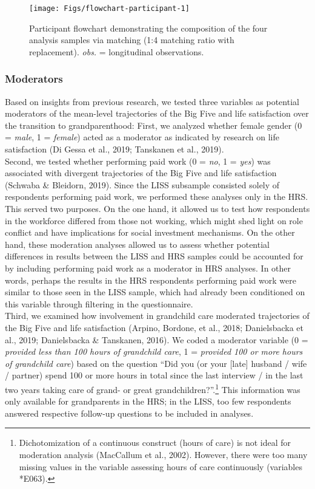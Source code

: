 \documentclass[
  english,
  man,floatsintext]{apa7}
\begin{document}
\begin{figure}

{\centering \texttt{[image: Figs/flowchart-participant-1]} 

}

\caption{Participant flowchart demonstrating the composition of the four analysis samples via matching (1:4 matching ratio with replacement). \emph{obs.} = longitudinal observations.}\label{fig:flowchart-participant}
\end{figure}

\hypertarget{moderators}{%
\subsubsection{Moderators}\label{moderators}}

Based on insights from previous research, we tested three variables as potential moderators of the mean-level trajectories of the Big Five and life satisfaction over the transition to grandparenthood: First, we analyzed whether female gender (0 = \emph{male}, 1 = \emph{female}) acted as a moderator as indicated by research on life satisfaction (Di Gessa et al., 2019; Tanskanen et al., 2019).\\
Second, we tested whether performing paid work (0 = \emph{no}, 1 = \emph{yes}) was associated with divergent trajectories of the Big Five and life satisfaction (Schwaba \& Bleidorn, 2019). Since the LISS subsample consisted solely of respondents performing paid work, we performed these analyses only in the HRS. This served two purposes. On the one hand, it allowed us to test how respondents in the workforce differed from those not working, which might shed light on role conflict and have implications for social investment mechanisms. On the other hand, these moderation analyses allowed us to assess whether potential differences in results between the LISS and HRS samples could be accounted for by including performing paid work as a moderator in HRS analyses. In other words, perhaps the results in the HRS respondents performing paid work were similar to those seen in the LISS sample, which had already been conditioned on this variable through filtering in the questionnaire.\\
Third, we examined how involvement in grandchild care moderated trajectories of the Big Five and life satisfaction (Arpino, Bordone, et al., 2018; Danielsbacka et al., 2019; Danielsbacka \& Tanskanen, 2016). We coded a moderator variable (0 = \emph{provided less than 100 hours of grandchild care}, 1 = \emph{provided 100 or more hours of grandchild care}) based on the question \enquote{Did you (or your {[}late{]} husband / wife / partner) spend 100 or more hours in total since the last interview / in the last two years taking care of grand- or great grandchildren?}.\footnote{Dichotomization of a continuous construct (hours of care) is not ideal for moderation analysis (MacCallum et al., 2002). However, there were too many missing values in the variable assessing hours of care continuously (variables *E063).} This information was only available for grandparents in the HRS; in the LISS, too few respondents answered respective follow-up questions to be included in analyses.
\end{document}

